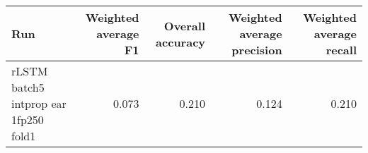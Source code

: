 \begin{tabular}{lrrrr}
\toprule
Run & Weighted average F1 & Overall accuracy & Weighted average precision & Weighted average recall \\
\midrule
rLSTM batch5 intprop ear 1fp250 fold1 & 0.073 & 0.210 & 0.124 & 0.210 \\
\bottomrule
\end{tabular}
